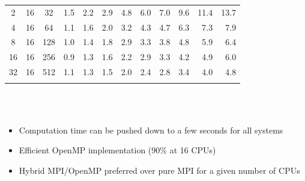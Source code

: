 \documentclass[mathserif, 8pt]{beamer}
\begin{document}
\begin{frame}
\begin{table}
\begin{tabular}{cccrrrrrrrrr}
	  2& 16& 32	&  1.5 	&  2.2 	&  2.9 	&  4.8  &  6.0  &  7.0  &  9.6  & 11.4  & 13.7  \\
	  4& 16& 64	&  1.1 	&  1.6 	&  2.0 	&  3.2  &  4.3  &  4.7  &  6.3  &  7.3  &  7.9  \\
	  8& 16&128	&  1.0 	&  1.4 	&  1.8 	&  2.9  &  3.3  &  3.8  &  4.8  &  5.9  &  6.4  \\
	 16& 16&256	&  0.9 	&  1.3 	&  1.6 	&  2.2  &  2.9  &  3.3  &  4.2  &  4.9  &  6.0  \\
	 32& 16&512	&  1.1 	&  1.3 	&  1.5 	&  2.0  &  2.4  &  2.8  &  3.4  &  4.0  &  4.8  \\
	   &   &   	&      	&      	&      	&    	&    	&	&	&	&	\\
	\hline                                                                           
	\hline
    \end{tabular}
    \end{table}
    \ \\
    \ \\
    \begin{itemize}
	\item Computation time can be pushed down to a few seconds for all systems
	\item Efficient OpenMP implementation (90\% at 16 CPUs)
	\item Hybrid MPI/OpenMP preferred over pure MPI for a given number of CPUs
    \end{itemize}
\end{frame}

\end{document}
